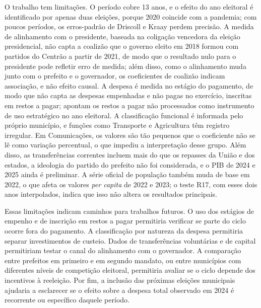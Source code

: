 O trabalho tem limitações. O período cobre 13 anos, e o efeito do ano eleitoral é identificado por apenas duas eleições, porque 2020 coincide com a pandemia; com poucos períodos, os erros-padrão de Driscoll e Kraay perdem precisão. A medida de alinhamento com o presidente, baseada na coligação vencedora da eleição presidencial, não capta a coalizão que o governo eleito em 2018 formou com partidos do Centrão a partir de 2021, de modo que o resultado nulo para o presidente pode refletir erro de medida; além disso, como o alinhamento muda junto com o prefeito e o governador, os coeficientes de coalizão indicam associação, e não efeito causal. A despesa é medida no estágio do pagamento, de modo que não capta as despesas empenhadas e não pagas no exercício, inscritas em restos a pagar; \textcite{vicente2012} apontam os restos a pagar não processados como instrumento de uso estratégico no ano eleitoral. A classificação funcional é informada pelo próprio município, e funções como Transporte e Agricultura têm registro irregular. Em Comunicações, os valores são tão pequenos que o coeficiente não se lê como variação percentual, o que impediu a interpretação desse grupo. Além disso, as transferências correntes incluem mais do que os repasses da União e dos estados, a ideologia do partido do prefeito não foi considerada, e o PIB de 2024 e 2025 ainda é preliminar. A série oficial de população também muda de base em 2022, o que afeta os valores \textit{per capita} de 2022 e 2023; o teste R17, com esses dois anos interpolados, indica que isso não altera os resultados principais.

Essas limitações indicam caminhos para trabalhos futuros. O uso dos estágios de empenho e de inscrição em restos a pagar permitiria verificar se parte do ciclo ocorre fora do pagamento. A classificação por natureza da despesa permitiria separar investimentos de custeio. Dados de transferências voluntárias e de capital permitiriam testar o canal do alinhamento com o governador. A comparação entre prefeitos em primeiro e em segundo mandato, ou entre municípios com diferentes níveis de competição eleitoral, permitiria avaliar se o ciclo depende dos incentivos à reeleição. Por fim, a inclusão das próximas eleições municipais ajudaria a esclarecer se o efeito sobre a despesa total observado em 2024 é recorrente ou específico daquele período.
